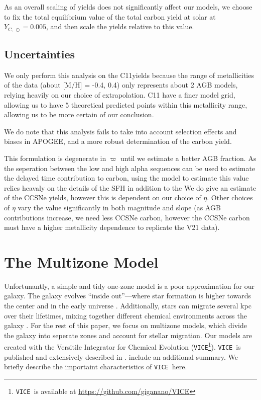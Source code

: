 \documentclass[12pt,oneside]{report}
\newcommand{\VICE}{\texttt{VICE}}
\newcommand{\sun}{\ensuremath{\odot}}
\begin{document}
    As an overall scaling of yields does not significantly affect our models, we choose to fix the total equilibrium value of the total carbon yield at solar at $Y_{\text{C},\ \sun} = 0.005$, and then scale the yields relative to this value. 


\section{Uncertainties}

We only perform this analysis on the C11yields because the range of metallicities of the data (about [M/H] = -0.4, 0.4) only represents about 2 AGB models, relying heavily on our choice of extrapolation. C11 have a finer model grid, allowing us to have 5 theoretical predicted points within this metallicity range, allowing us to be more certain of our conclusion. 

We do note that this analysis fails to take into account selection effects and biases in APOGEE, and a more robust determination of the carbon yield. 


This formulation is degenerate in $\varpi$ until we estimate a better AGB fraction. As the seperation between the low and high alpha sequences can be used to estimate the delayed time contribution to carbon, using the model to estimate this value relies heavaly on the details of the SFH in addition to the 
We do give an estimate of the CCSNe yields, however this is dependent on our choice of $\eta$. Other choices of $\eta$ vary the value significantly in both magnitude and slope (as AGB contributions increase, we need less CCSNe carbon, however the CCSNe carbon must have a higher metallicity dependence to replicate the V21 data). 



\chapter{The Multizone Model}\label{sec:vice}

Unfortunantly, a simple and tidy one-zone model is a poor approximation for our galaxy. The galaxy evolves ``inside out''---where star formation is higher towards the center and in the early universe \citep{bird+13}. Additionally, stars can migrate several kpc over their lifetimes, mixing together different chemical environments across the galaxy \citep{bird+12,sellwood+binney02}. For the rest of this paper, we focus on multizone models, which divide the galaxy into seperate zones and account for stellar migration. 
Our models are created with the Versitile Integrator for Chemical Evolution (\VICE\footnote{\VICE~is available at \url{https://github.com/giganano/VICE}}). \VICE~is published and extensively described in \citet{james+21}. \citet{james+22} include an additional summary. We briefly describe the importaint characteristics of \VICE~here.
\end{document}
